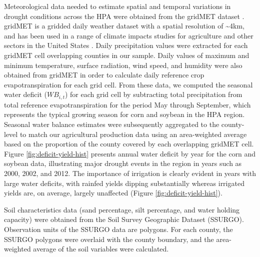 \documentclass[
]{article}
\begin{document}
Meteorological data needed to estimate spatial and temporal variations in drought conditions across the HPA were obtained from the gridMET dataset \citep{Abatzoglou2013}. gridMET is a gridded daily weather dataset with a spatial resolution of \textasciitilde4km, and has been used in a range of climate impacts studies for agriculture and other sectors in the United States \citep{abatzoglou2016impact, pereira2015crop, crane2018machine, venkatappa2021impacts, zhu2019dissecting}. Daily precipitation values were extracted for each gridMET cell overlapping counties in our sample. Daily values of maximum and minimum temperature, surface radiation, wind speed, and humidity were also obtained from gridMET in order to calculate daily reference crop evapotranspiration for each grid cell. From these data, we computed the seasonal water deficit (\(WB_{i,t}\)) for each grid cell by subtracting total precipitation from total reference evapotranspiration for the period May through September, which represents the typical growing season for corn and soybean in the HPA region. Seasonal water balance estimates were subsequently aggregated to the county-level to match our agricultural production data using an area-weighted average based on the proportion of the county covered by each overlapping gridMET cell. Figure \ref{fig:deficit-yield-hist} presents annual water deficit by year for the corn and soybean data, illustrating major drought events in the region in years such as 2000, 2002, and 2012. The importance of irrigation is clearly evident in years with large water deficits, with rainfed yields dipping substantially whereas irrigated yields are, on average, largely unaffected (Figure \ref{fig:deficit-yield-hist}).

Soil characteristics data (sand percentage, silt percentage, and water holding capacity) were obtained from the Soil Survey Geographic
Dataset (SSURGO). Observation units of the SSURGO data are polygons. For each county, the SSURGO polygons were overlaid with the county boundary, and the area-weighted average of the soil variables were calculated.
\end{document}
